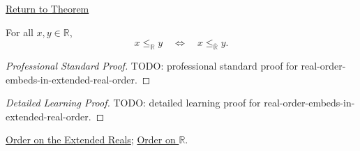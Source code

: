 \newpage
{}
\label{prf:real-order-embeds-in-extended-real-order}
\begin{remark*}[Return]
\hyperref[thm:real-order-embeds-in-extended-real-order]{Return to Theorem}
\end{remark*}
\begin{theorem*}
For all $x,y\in\mathbb{R}$,
\[
x\le_{\mathbb{R}}y
\quad\Longleftrightarrow\quad
x\le_{\overline{\mathbb{R}}}y.
\]
\end{theorem*}
\begin{proof}[Professional Standard Proof]
\LRAProofBodyStart
TODO: professional standard proof for real-order-embeds-in-extended-real-order.
\end{proof}
\begin{proof}[Detailed Learning Proof]
\LRAProofBodyStart
TODO: detailed learning proof for real-order-embeds-in-extended-real-order.
\end{proof}
\begin{remark*}
\end{remark*}
\begin{dependencies}
\hyperref[def:extended-real-order]{Order on the Extended Reals};
\hyperref[def:order-on-r]{Order on $\mathbb{R}$}.
\end{dependencies}
\clearpage
